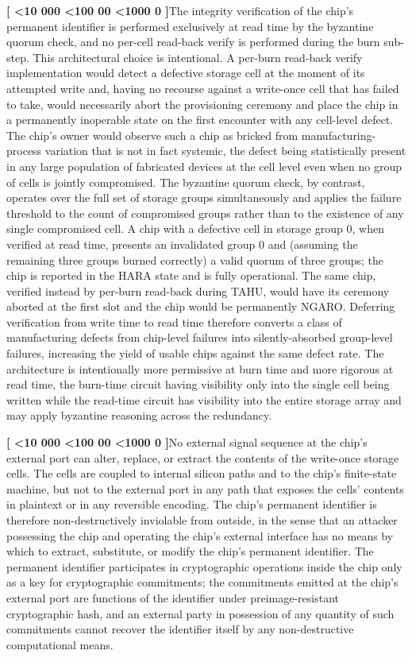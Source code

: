 \documentclass[12pt,letterpaper]{article}
\newcounter{para}
\newcommand{\padzero}{%
  \ifnum\value{para}<10 000\else%
  \ifnum\value{para}<100 00\else%
  \ifnum\value{para}<1000 0\else%
  \fi\fi\fi}
\newcommand{\para}{%
  \refstepcounter{para}\noindent\textbf{[\padzero\arabic{para}]}\hspace{0.5em}\ignorespaces}
\begin{document}
\para The integrity verification of the chip's permanent identifier is performed exclusively at read time by the byzantine quorum check, and no per-cell read-back verify is performed during the burn sub-step. This architectural choice is intentional. A per-burn read-back verify implementation would detect a defective storage cell at the moment of its attempted write and, having no recourse against a write-once cell that has failed to take, would necessarily abort the provisioning ceremony and place the chip in a permanently inoperable state on the first encounter with any cell-level defect. The chip's owner would observe such a chip as bricked from manufacturing-process variation that is not in fact systemic, the defect being statistically present in any large population of fabricated devices at the cell level even when no group of cells is jointly compromised. The byzantine quorum check, by contrast, operates over the full set of storage groups simultaneously and applies the failure threshold to the count of compromised groups rather than to the existence of any single compromised cell. A chip with a defective cell in storage group 0, when verified at read time, presents an invalidated group 0 and (assuming the remaining three groups burned correctly) a valid quorum of three groups; the chip is reported in the HARA state and is fully operational. The same chip, verified instead by per-burn read-back during TAHU, would have its ceremony aborted at the first slot and the chip would be permanently NGARO. Deferring verification from write time to read time therefore converts a class of manufacturing defects from chip-level failures into silently-absorbed group-level failures, increasing the yield of usable chips against the same defect rate. The architecture is intentionally more permissive at burn time and more rigorous at read time, the burn-time circuit having visibility only into the single cell being written while the read-time circuit has visibility into the entire storage array and may apply byzantine reasoning across the redundancy.

\para No external signal sequence at the chip's external port can alter, replace, or extract the contents of the write-once storage cells. The cells are coupled to internal silicon paths and to the chip's finite-state machine, but not to the external port in any path that exposes the cells' contents in plaintext or in any reversible encoding. The chip's permanent identifier is therefore non-destructively inviolable from outside, in the sense that an attacker possessing the chip and operating the chip's external interface has no means by which to extract, substitute, or modify the chip's permanent identifier. The permanent identifier participates in cryptographic operations inside the chip only as a key for cryptographic commitments; the commitments emitted at the chip's external port are functions of the identifier under preimage-resistant cryptographic hash, and an external party in possession of any quantity of such commitments cannot recover the identifier itself by any non-destructive computational means.
\end{document}
